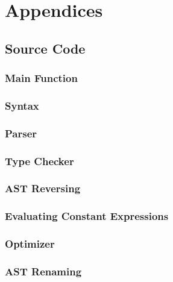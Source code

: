 \section{Appendices} \label{sec:appendices}
\subsection{Source Code}
\subsubsection{Main Function}


\subsubsection{Syntax}


\subsubsection{Parser}


\subsubsection{Type Checker}


\subsubsection{AST Reversing}


\subsubsection{Evaluating Constant Expressions}


\subsubsection{Optimizer}


\subsubsection{AST Renaming}



